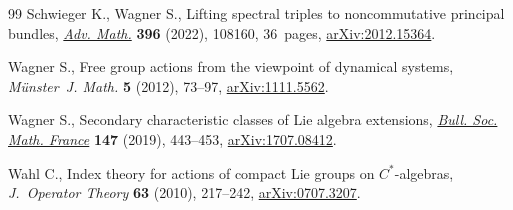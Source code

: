\documentclass[pdftex]{sigma}
\numberwithin{equation}{section}
\begin{document}
\begin{thebibliography}{99}
Schwieger K., Wagner S., Lifting spectral triples to noncommutative principal
 bundles, \href{https://doi.org/10.1016/j.aim.2021.108160}{\textit{Adv. Math.}} \textbf{396} (2022), 108160, 36~pages,
 \href{https://arxiv.org/abs/2012.15364}{arXiv:2012.15364}.

Wagner S., Free group actions from the viewpoint of dynamical systems,
 \textit{M\"unster~J. Math.} \textbf{5} (2012), 73--97, \href{https://arxiv.org/abs/1111.5562}{arXiv:1111.5562}.

Wagner S., Secondary characteristic classes of {L}ie algebra extensions,
 \href{https://doi.org/10.24033/bsmf.278}{\textit{Bull. Soc. Math. France}} \textbf{147} (2019), 443--453,
 \href{https://arxiv.org/abs/1707.08412}{arXiv:1707.08412}.

Wahl C., Index theory for actions of compact {L}ie groups on {$C^*$}-algebras,
 \textit{J.~Operator Theory} \textbf{63} (2010), 217--242, \href{https://arxiv.org/abs/0707.3207}{arXiv:0707.3207}.

\end{thebibliography}\LastPageEnding
\end{document}
